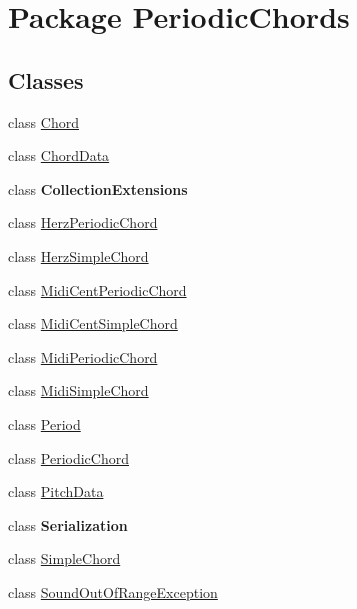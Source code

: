 \hypertarget{namespace_periodic_chords}{\section{Package Periodic\+Chords}
\label{namespace_periodic_chords}
}
\subsection*{Classes}
\begin{DoxyCompactItemize}
\item 
class \hyperlink{class_periodic_chords_1_1_chord}{Chord}
\item 
class \hyperlink{class_periodic_chords_1_1_chord_data}{Chord\+Data}
\item 
class {\bfseries Collection\+Extensions}
\item 
class \hyperlink{class_periodic_chords_1_1_herz_periodic_chord}{Herz\+Periodic\+Chord}
\item 
class \hyperlink{class_periodic_chords_1_1_herz_simple_chord}{Herz\+Simple\+Chord}
\item 
class \hyperlink{class_periodic_chords_1_1_midi_cent_periodic_chord}{Midi\+Cent\+Periodic\+Chord}
\item 
class \hyperlink{class_periodic_chords_1_1_midi_cent_simple_chord}{Midi\+Cent\+Simple\+Chord}
\item 
class \hyperlink{class_periodic_chords_1_1_midi_periodic_chord}{Midi\+Periodic\+Chord}
\item 
class \hyperlink{class_periodic_chords_1_1_midi_simple_chord}{Midi\+Simple\+Chord}
\item 
class \hyperlink{class_periodic_chords_1_1_period}{Period}
\item 
class \hyperlink{class_periodic_chords_1_1_periodic_chord}{Periodic\+Chord}
\item 
class \hyperlink{class_periodic_chords_1_1_pitch_data}{Pitch\+Data}
\item 
class {\bfseries Serialization}
\item 
class \hyperlink{class_periodic_chords_1_1_simple_chord}{Simple\+Chord}
\item 
class \hyperlink{class_periodic_chords_1_1_sound_out_of_range_exception}{Sound\+Out\+Of\+Range\+Exception}
\end{DoxyCompactItemize}
